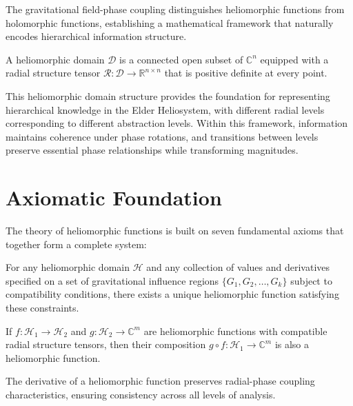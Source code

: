 The gravitational field-phase coupling distinguishes heliomorphic functions from holomorphic functions, establishing a mathematical framework that naturally encodes hierarchical information structure.

\begin{definition}
A heliomorphic domain $\mathcal{D}$ is a connected open subset of $\mathbb{C}^n$ equipped with a radial structure tensor $\mathcal{R}: \mathcal{D} \rightarrow \mathbb{R}^{n \times n}$ that is positive definite at every point.
\end{definition}

This heliomorphic domain structure provides the foundation for representing hierarchical knowledge in the Elder Heliosystem, with different radial levels corresponding to different abstraction levels. Within this framework, information maintains coherence under phase rotations, and transitions between levels preserve essential phase relationships while transforming magnitudes.

\section{Axiomatic Foundation}

The theory of heliomorphic functions is built on seven fundamental axioms that together form a complete system:

\begin{axiom}
For any heliomorphic domain $\mathcal{H}$ and any collection of values and derivatives specified on a set of gravitational influence regions $\{G_1, G_2, \ldots, G_k\}$ subject to compatibility conditions, there exists a unique heliomorphic function satisfying these constraints.
\end{axiom}

\begin{axiom}
If $f: \mathcal{H}_1 \rightarrow \mathcal{H}_2$ and $g: \mathcal{H}_2 \rightarrow \mathbb{C}^m$ are heliomorphic functions with compatible radial structure tensors, then their composition $g \circ f: \mathcal{H}_1 \rightarrow \mathbb{C}^m$ is also a heliomorphic function.
\end{axiom}

\begin{axiom}
The derivative of a heliomorphic function preserves radial-phase coupling characteristics, ensuring consistency across all levels of analysis.
\end{axiom}

